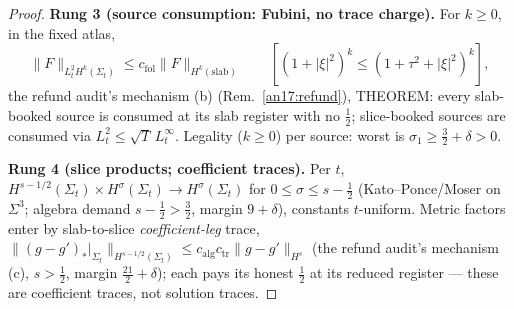 \begin{proof}
\medskip\noindent
\textbf{Rung 3 (source consumption: Fubini, no trace charge).} For $k\ge0$, in
the fixed atlas,
\begin{equation}\label{an17:eq-slice-fubini}
 \|F\|_{L^2_t H^{k}(\Sigma_t)}\le c_{\mathrm{fol}}\|F\|_{H^{k}(\mathrm{slab})}
 \qquad[(1+|\xi|^2)^k\le(1+\tau^2+|\xi|^2)^k],
\end{equation}
the refund audit's mechanism (b) (Rem.~\ref{an17:refund}), THEOREM: every
slab-booked source is consumed at its slab register with no $\tfrac12$;
slice-booked sources are consumed via $L^2_t\le\sqrt T\,L^\infty_t$. Legality
($k\ge0$) per source: worst is $\sigma_1\ge\tfrac32+\delta>0$.

\medskip\noindent
\textbf{Rung 4 (slice products; coefficient traces).} Per $t$,
$H^{s-1/2}(\Sigma_t)\times H^{\sigma}(\Sigma_t)\to H^{\sigma}(\Sigma_t)$ for
$0\le\sigma\le s-\tfrac12$ (Kato--Ponce/Moser on $\Sigma^3$; algebra demand
$s-\tfrac12>\tfrac32$, margin $9+\delta$), constants $t$-uniform. Metric factors
enter by slab-to-slice \emph{coefficient-leg} trace,
$\|(g-g')_*|_{\Sigma_t}\|_{H^{s-1/2}(\Sigma_t)}\le
c_{\mathrm{alg}}c_{\mathrm{tr}}\|g-g'\|_{H^s}$ (the refund audit's mechanism (c),
$s>\tfrac12$, margin $\tfrac{21}2+\delta$); each pays its honest $\tfrac12$ at
its reduced register --- these are coefficient traces, not solution traces.


\end{proof}
